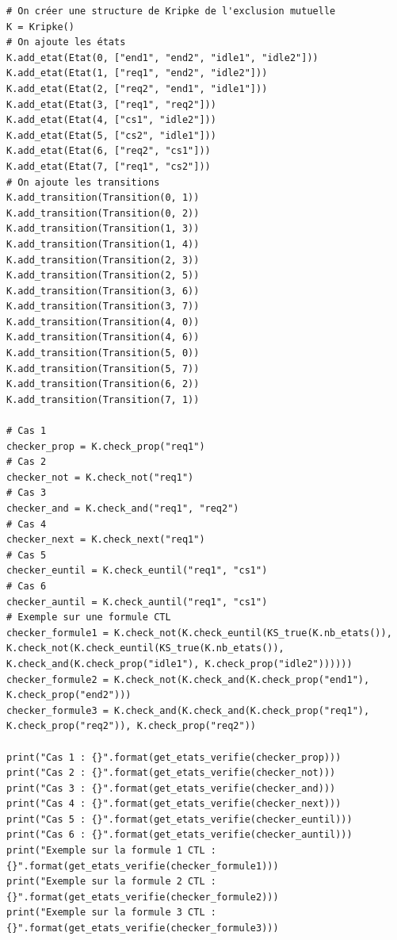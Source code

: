 \documentclass[12pt,a4paper]{report}
\begin{document}
\begin{verbatim}
# On créer une structure de Kripke de l'exclusion mutuelle
K = Kripke()
# On ajoute les états
K.add_etat(Etat(0, ["end1", "end2", "idle1", "idle2"]))
K.add_etat(Etat(1, ["req1", "end2", "idle2"]))
K.add_etat(Etat(2, ["req2", "end1", "idle1"]))
K.add_etat(Etat(3, ["req1", "req2"]))
K.add_etat(Etat(4, ["cs1", "idle2"]))
K.add_etat(Etat(5, ["cs2", "idle1"]))
K.add_etat(Etat(6, ["req2", "cs1"]))
K.add_etat(Etat(7, ["req1", "cs2"]))
# On ajoute les transitions
K.add_transition(Transition(0, 1))
K.add_transition(Transition(0, 2))
K.add_transition(Transition(1, 3))
K.add_transition(Transition(1, 4))
K.add_transition(Transition(2, 3))
K.add_transition(Transition(2, 5))
K.add_transition(Transition(3, 6))
K.add_transition(Transition(3, 7))
K.add_transition(Transition(4, 0))
K.add_transition(Transition(4, 6))
K.add_transition(Transition(5, 0))
K.add_transition(Transition(5, 7))
K.add_transition(Transition(6, 2))
K.add_transition(Transition(7, 1))

# Cas 1
checker_prop = K.check_prop("req1")
# Cas 2
checker_not = K.check_not("req1")
# Cas 3
checker_and = K.check_and("req1", "req2")
# Cas 4
checker_next = K.check_next("req1")
# Cas 5
checker_euntil = K.check_euntil("req1", "cs1")
# Cas 6
checker_auntil = K.check_auntil("req1", "cs1")
# Exemple sur une formule CTL
checker_formule1 = K.check_not(K.check_euntil(KS_true(K.nb_etats()), K.check_not(K.check_euntil(KS_true(K.nb_etats()), K.check_and(K.check_prop("idle1"), K.check_prop("idle2"))))))
checker_formule2 = K.check_not(K.check_and(K.check_prop("end1"), K.check_prop("end2")))
checker_formule3 = K.check_and(K.check_and(K.check_prop("req1"), K.check_prop("req2")), K.check_prop("req2"))

print("Cas 1 : {}".format(get_etats_verifie(checker_prop)))
print("Cas 2 : {}".format(get_etats_verifie(checker_not)))
print("Cas 3 : {}".format(get_etats_verifie(checker_and)))
print("Cas 4 : {}".format(get_etats_verifie(checker_next)))
print("Cas 5 : {}".format(get_etats_verifie(checker_euntil)))
print("Cas 6 : {}".format(get_etats_verifie(checker_auntil)))
print("Exemple sur la formule 1 CTL : {}".format(get_etats_verifie(checker_formule1)))
print("Exemple sur la formule 2 CTL : {}".format(get_etats_verifie(checker_formule2)))
print("Exemple sur la formule 3 CTL : {}".format(get_etats_verifie(checker_formule3)))
\end{verbatim}
\end{document}
